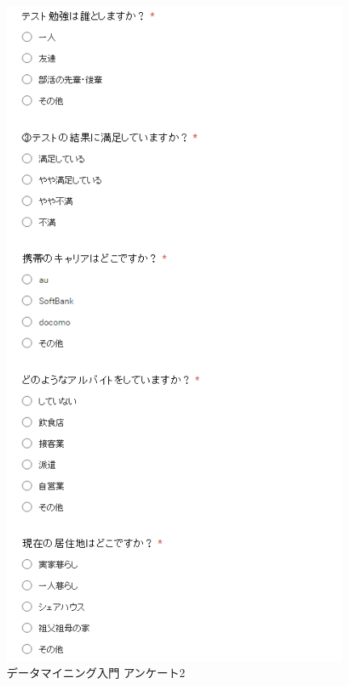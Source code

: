 \begin{figure}[p]
\centering
\includegraphics[width=11cm]{forms2.PNG}
\caption{データマイニング入門 アンケート2}\label{サンプル図}
\end{figure}

